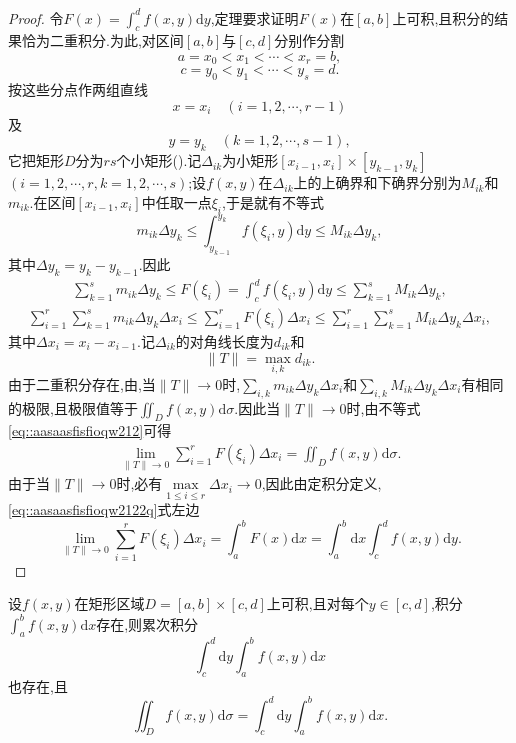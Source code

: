 \documentclass[../../main.tex]{subfiles}%
\begin{document}
\begin{proof}
令$F(x)=\int_c^d f(x,y)\mathrm{d}y$,定理要求证明$F(x)$在$[a,b]$上可积,且积分的结果恰为二重积分.为此,对区间$[a,b]$与$[c,d]$分别作分割
\[
a=x_0<x_1<\cdots<x_r=b,
\]
\[
c=y_0<y_1<\cdots<y_s=d.
\]
按这些分点作两组直线
\[
x=x_i\quad(i=1,2,\cdots,r-1)
\]
及
\[
y=y_k\quad(k=1,2,\cdots,s-1),
\]
它把矩形$D$分为$rs$个小矩形().记$\Delta_{ik}$为小矩形$[x_{i-1},x_i]\times[y_{k-1},y_k]$ $(i=1,2,\cdots,r,k=1,2,\cdots,s)$;设$f(x,y)$在$\Delta_{ik}$上的上确界和下确界分别为$M_{ik}$和$m_{ik}$.在区间$[x_{i-1},x_i]$中任取一点$\xi_i$,于是就有不等式
\[
m_{ik}\Delta y_k \leqslant \int_{y_{k-1}}^{y_k} f(\xi_i,y)\mathrm{d}y \leqslant M_{ik}\Delta y_k,
\]
其中$\Delta y_k=y_k-y_{k-1}$.因此
\begin{align*}
\sum_{k=1}^s m_{ik}\Delta y_k \leqslant F(\xi_i)=\int_c^d f(\xi_i,y)\mathrm{d}y \leqslant \sum_{k=1}^s M_{ik}\Delta y_k,
\end{align*}
\begin{align}
\sum_{i=1}^r \sum_{k=1}^s m_{ik}\Delta y_k\Delta x_i \leqslant \sum_{i=1}^r F(\xi_i)\Delta x_i \leqslant \sum_{i=1}^r \sum_{k=1}^s M_{ik}\Delta y_k\Delta x_i, \label{eq::aasaasfisfioqw212}
\end{align}
其中$\Delta x_i=x_i-x_{i-1}$.记$\Delta_{ik}$的对角线长度为$d_{ik}$和
\[
\|T\|=\max\limits_{i,k} d_{ik}.
\]
由于二重积分存在,由,当$\|T\|\to0$时,$\sum\limits_{i,k} m_{ik}\Delta y_k\Delta x_i$和$\sum\limits_{i,k} M_{ik}\Delta y_k\Delta x_i$有相同的极限,且极限值等于$\iint_D f(x,y)\mathrm{d}\sigma$.因此当$\|T\|\to0$时,由不等式\eqref{eq::aasaasfisfioqw212}可得
\begin{align}
\lim_{\|T\|\to0} \sum_{i=1}^r F(\xi_i)\Delta x_i = \iint_D f(x,y)\mathrm{d}\sigma. \label{eq::aasaasfisfioqw2122q}
\end{align}
由于当$\|T\|\to0$时,必有$\max\limits_{1\leqslant i\leqslant r}\Delta x_i\to0$,因此由定积分定义,\eqref{eq::aasaasfisfioqw2122q}式左边
\[
\lim_{\|T\|\to0} \sum_{i=1}^r F(\xi_i)\Delta x_i = \int_a^b F(x)\mathrm{d}x = \int_a^b \mathrm{d}x \int_c^d f(x,y)\mathrm{d}y.
\]
\end{proof}

\begin{theorem}\label{theorem:数分--二重积分计算定理--2}
设$f(x,y)$在矩形区域$D=[a,b]\times[c,d]$上可积,且对每个$y\in[c,d]$,积分$\int_a^b f(x,y)\mathrm{d}x$存在,则累次积分
\[
\int_c^d \mathrm{d}y \int_a^b f(x,y)\mathrm{d}x
\]
也存在,且
\[
\iint_D f(x,y)\mathrm{d}\sigma = \int_c^d \mathrm{d}y \int_a^b f(x,y)\mathrm{d}x.
\]
\end{theorem}
\end{document}
